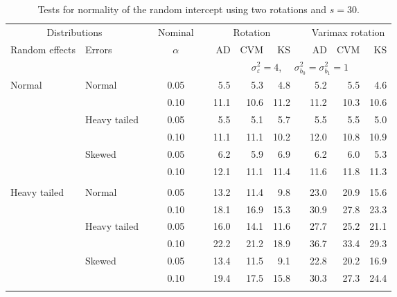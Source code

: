 \begin{table}[ht]
\caption{\label{tab:simb0s30-alt}Tests for normality of the random intercept using two rotations and $s = 30$.}
\begin{scriptsize}
\begin{center}
\begin{tabular}{ll p{.1cm} c p{.1cm} rrr p{.1cm} rrr}
  \hline
  \multicolumn{2}{c}{Distributions}& & Nominal & &  \multicolumn{3}{c}{Rotation} & & \multicolumn{3}{c}{Varimax rotation} \\ \cline{1-2} \cline{6-8} \cline{10-12}   
  Random effects & Errors & & $\alpha$ & & AD & CVM & KS & & AD & CVM & KS \\ 
   \hline
& && && \multicolumn{7}{c}{$\sigma_{\varepsilon}^2 = 4$, \ \ $\sigma_{b_0}^2 = \sigma_{b_1}^2 = 1$} \\ \cline{6-12}
\rowcolor{gray!20}Normal       & Normal       && 0.05 &&   5.5 & 5.3 & 4.8 &   & 5.2 & 5.5 & 4.6 \\ 
\rowcolor{gray!20}             &              && 0.10 &&   11.1 & 10.6 & 11.2 &   & 11.2 & 10.3 & 10.6 \\ 
\rowcolor{gray!20}             & Heavy tailed && 0.05 &&   5.5 & 5.1 & 5.7 &   & 5.5 & 5.5 & 5.0 \\ 
\rowcolor{gray!20}             &              && 0.10 &&   11.1 & 11.1 & 10.2 &   & 12.0 & 10.8 & 10.9 \\ 
\rowcolor{gray!20}             & Skewed       && 0.05 &&   6.2 & 5.9 & 6.9 &   & 6.2 & 6.0 & 5.3 \\ 
\rowcolor{gray!20}             &              && 0.10 &&   12.1 & 11.1 & 11.4 &   & 11.6 & 11.8 & 11.3 \\ 
&&&&&&&&&&&\\
Heavy tailed & Normal       && 0.05 &&   13.2 & 11.4 & 9.8 &   & 23.0 & 20.9 & 15.6 \\ 
             &              && 0.10 &&   18.1 & 16.9 & 15.3 &   & 30.9 & 27.8 & 23.3 \\ 
             & Heavy tailed && 0.05 &&   16.0 & 14.1 & 11.6 &   & 27.7 & 25.2 & 21.1 \\ 
             &              && 0.10 &&   22.2 & 21.2 & 18.9 &   & 36.7 & 33.4 & 29.3 \\ 
             & Skewed       && 0.05 &&   13.4 & 11.5 & 9.1 &   & 22.8 & 20.2 & 16.9 \\ 
             &              && 0.10 &&   19.4 & 17.5 & 15.8 &   & 30.3 & 27.3 & 24.4 \\ 
&&&&&&&&&&&\\

\end{tabular}
\end{center}
\end{scriptsize}
\end{table}
